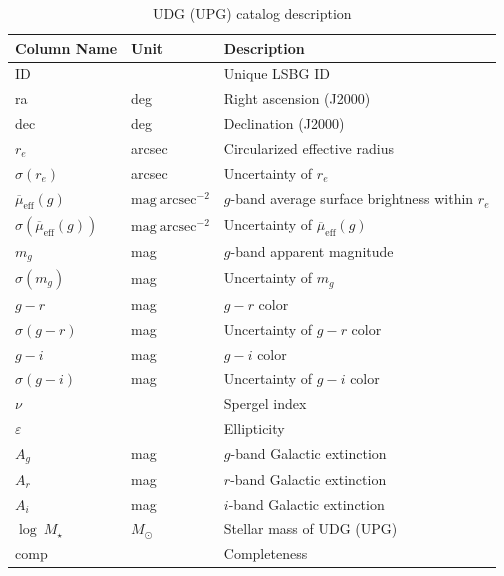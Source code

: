 \documentclass[twocolumn,astrosymb,twocolappendix]{aastex631}
\newcommand{\sbunit}{\mathrm{mag\ arcsec}^{-2}}
\begin{document}
\begin{CJK*}{UTF8}{gbsn}
\begin{table}
\caption{UDG (UPG) catalog description} 
\label{tab:catalog}
\begin{center}
\begin{tabular}{l l l}
\hline\hline
Column Name      & Unit    & Description                    \\
\hline
ID                       &         & Unique LSBG ID \\
ra                       & deg     & Right ascension (J2000) \\
dec                      & deg     & Declination (J2000) \\
$r_e$         & arcsec  & Circularized effective radius  \\
$\sigma(r_e)$ & arcsec  & Uncertainty of $r_e$ \\
$\overline{\mu}_{\mathrm{eff}}(g)$               & $\sbunit$ & $g$-band average surface brightness within $r_e$ \\
$\sigma(\overline{\mu}_{\mathrm{eff}}(g))$       & $\sbunit$ & Uncertainty of $\overline{\mu}_{\mathrm{eff}}(g)$           \\
$m_g$                    & mag     & $g$-band apparent magnitude     \\
$\sigma(m_g)$            & mag     & Uncertainty of $m_g$            \\
$g-r$                    & mag     & $g-r$ color                     \\
$\sigma(g-r)$            & mag     & Uncertainty of $g-r$ color      \\
$g-i$                    & mag     & $g-i$ color                     \\
$\sigma(g-i)$            & mag     & Uncertainty of $g-i$ color      \\
$\nu$                    &         & Spergel index              \\
$\varepsilon$            &         & Ellipticity                     \\
$A_g$                    & mag     & $g$-band Galactic extinction \\
$A_r$                    & mag     & $r$-band Galactic extinction \\
$A_i$                    & mag     & $i$-band Galactic extinction \\
$\log\ M_\star$ & $M_\odot$ & Stellar mass of UDG (UPG) \\
comp & & Completeness \\

\end{tabular}
\end{center}
\end{table}
\end{CJK*}
\end{document}
